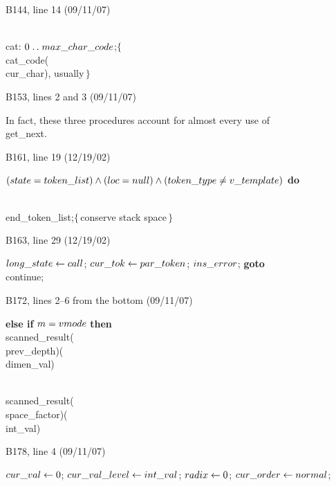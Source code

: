 {{\bugonpage B144, line 14 (09/11/07)

\ninepoint\noindent
\quad\\{cat}: $0\to\\{max\_char\_code}$;\quad$\{\,$\\{cat\_code}(\\{cur\_char}), usually$\,\}$

\bugonpage B153, lines 2 and 3 (09/11/07)

\tenpoint\noindent
In fact, these three procedures account for almost every use of \\{get\_next}.

\bugonpage B161, line 19 (12/19/02)

\ninepoint\noindent
{} $(\\{state}=\\{token\_list}) \land
 (\\{loc}=\\{null}) \land (\\{token\_type}\ne\\{v\_template})$ {\bf do}\par
\noindent\qquad\\{end\_token\_list};\quad$\{\,$conserve stack space$\,\}$

\bugonpage B163, line 29 (12/19/02)

\ninepoint\noindent
\quad$\\{long\_state}\gets\\{call}$;
$\\{cur\_tok}\gets\\{par\_token}$;
$\\{ins\_error}$;
{\bf goto} \\{continue};

\bugonpage B172, lines 2--6 from the bottom (09/11/07)

\ninepoint\noindent
{\bf else if\/} $m=\\{vmode}$ {\bf then} \\{scanned\_result}(\\{prev\_depth})(\\{dimen\_val})\par\noindent
{} \\{scanned\_result}(\\{space\_factor})(\\{int\_val})

\bugonpage B178, line 4 (09/11/07)

\ninepoint\noindent
\quad$\\{cur\_val}\gets0$;
$\\{cur\_val\_level}\gets\\{int\_val}$;
$\\{radix}\gets0$;
$\\{cur\_order}\gets\\{normal}$;

}}
